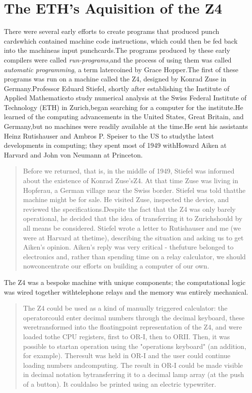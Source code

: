 \section{The ETH's Aquisition of the Z4}
There were several early efforts to create programs that produced punch
cardswhich contained machine code instructions, which could then be fed back
into the machineas input punchcards.The programs produced by these early
compilers were called \textit{run-programs},and the process of using them was
called \textit{automatic programming}, a term latercoined by Grace Hopper.The
first of these programs was run on a machine called the Z4, designed by Konrad
Zuse in Germany.Professor Eduard Stiefel, shortly after establishing the
Institute of Applied Mathematicsto study numerical analysis at the Swiss
Federal Institute of Technology (ETH) in Zurich,began searching for a computer
for the institute.He learned of the computing advancements in the United
States, Great Britain, and Germany,but no machines were readily available at
the time.He sent his assistants Heinz Rutishauser and Ambros P. Speiser to the
US to studythe latest developments in computing; they spent most of 1949
withHoward Aiken at Harvard and John von Neumann at Princeton.
\begin{quotation}
    Before we returned, that is, in the middle of 1949, Stiefel was informed 
about the existence of Konrad Zuse'sZ4. At that time Zuse was living in 
Hopferau, a German village near the Swiss border. Stiefel was told thatthe 
machine might be for sale. He visited Zuse, inspected the device, and reviewed 
the specifications.Despite the fact that the Z4 was only barely operational, he 
decided that the idea of transferring it to Zurichshould by all means be 
considered. Stiefel wrote a letter to Rutishauser and me (we were at Harvard at 
thetime), describing the situation and asking us to get Aiken's opinion. 
Aiken's reply was very critical - thefuture belonged to electronics and, rather 
than spending time on a relay calculator, we should nowconcentrate our efforts 
on building a computer of our own.
    \cite{konrad-zuses-z4-2000}
\end{quotation}
The Z4 was a bespoke machine with unique components; the computational logic 
was wired together withtelephone relays and the memory was entirely mechanical.
\begin{quotation}
    The Z4 could be used as a kind of manually triggered calculator: the 
operatorcould enter decimal numbers through the decimal keyboard, these 
weretransformed into the floatingpoint representation of the Z4, and were 
loaded tothe CPU registers, first to OR-I, then to ORII. Then, it was possible 
to startan operation using the "operations keyboard" (an addition, for 
example). Theresult was held in OR-I and the user could continue loading 
numbers andcomputing. The result in OR-I could be made visible in decimal 
notation bytransferring it to a decimal lamp array (at the push of a button). 
It couldalso be printed using an electric typewriter.
    \cite{architecture-of-konrad-zuses-z4-computer-2021}
\end{quotation}
